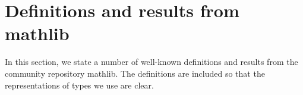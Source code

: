 \section{Definitions and results from mathlib}

In this section, we state a number of well-known definitions and results from the community repository mathlib.
The definitions are included so that the representations of types we use are clear.




